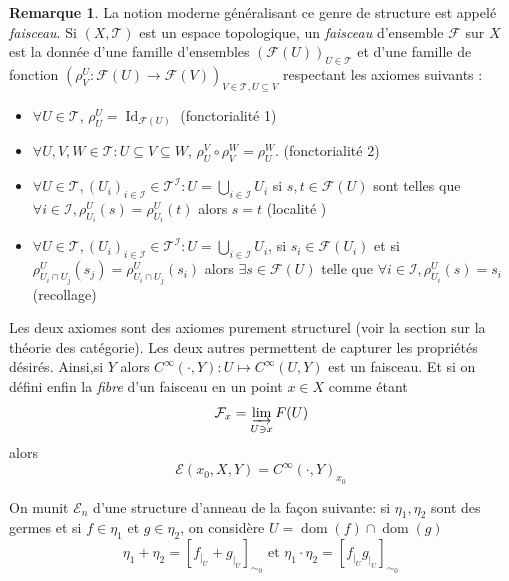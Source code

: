 \documentclass[a4paper,12pt,oneside,titlepage]{article}
\theoremstyle{definition}
\newtheorem{remarque}[definition]{Remarque}
\theoremstyle{plain}
\begin{document}
\begin{remarque}
    La notion moderne généralisant ce genre de structure est appelé \textit{faisceau}.
    Si $(X,\mathcal{T})$ est un espace topologique, un \textit{faisceau} d'ensemble $\mathcal{F}$ sur $X$ est la donnée d'une famille d'ensembles $(\mathcal{F}(U))_{U\in \mathcal{T} }$ et d'une famille de fonction $(\rho^U_V: \mathcal{F}(U)\rightarrow\mathcal{F}(V))_{V\in \mathcal{T}, U\subseteq V}$ respectant les axiomes suivants :
    \begin{itemize}
        \item $\forall U\in\mathcal{T}$, $\rho^U_U = \operatorname{Id}_{\mathcal{F}(U)}$ (fonctorialité 1)
        \item $\forall U,V,W\in\mathcal{T}: U\subseteq V\subseteq W$, $\rho^V_U\circ \rho^W_V=\rho^W_U$. (fonctorialité 2)
        \item $\forall U\in\mathcal{T}, (U_i)_{i\in\mathcal{I}}\in\mathcal{T}^{\mathcal{I}}: U=\bigcup_{i\in\mathcal{I}}U_i$ si $s,t\in\mathcal{F}(U)$ sont telles que \\$ \forall i\in\mathcal{I} ,\rho^U_{U_i}(s)=\rho^U_{U_i}(t)$ alors $s=t$ (localité )
        \item $\forall U\in\mathcal{T}, (U_i)_{i\in\mathcal{I}}\in\mathcal{T}^{\mathcal{I}}: U=\bigcup_{i\in\mathcal{I}}U_i$, si $s_i\in\mathcal{F}(U_i)$ et si $\rho^U_{U_i\cap U_j}(s_j)=\rho^U_{U_i\cap U_j}(s_i)$ alors $\exists s\in\mathcal{F}(U)$ telle que $\forall i\in\mathcal{I},\rho^U_{U_i}(s)=s_i$ (recollage)
    \end{itemize}
    Les deux axiomes sont des axiomes purement structurel (voir la section sur la théorie des catégorie). Les deux autres permettent de capturer les propriétés désirés. Ainsi,si $Y$ alors $C^{\infty}(\cdot,Y): U\mapsto C^{\infty}(U,Y)$ est un faisceau. Et si on défini enfin la \textit{fibre} d'un faisceau en un point $x\in X$ comme étant
    \begin{equation*}
        \mathcal{F}_x=\varinjlim_{U \ni x} F(U)
    \end{equation*}
    alors
    \begin{equation*}
        \mathcal{E}(x_0,X,Y)=C^{\infty}(\cdot,Y)_{x_0}
    \end{equation*} 
\end{remarque}

On munit $\mathcal{E}_n$ d'une structure d'anneau de la façon suivante: si $\eta_1,\eta_2$ sont des germes et si $f\in\eta_1$ et $g\in\eta_2$, on considère $U=\operatorname{dom}(f)\cap \operatorname{dom}(g)$ 
\begin{equation*}
    \eta_1+\eta_2= [f_{|_U}+g_{|_U}]_{\sim_{0}} \text{ et } \eta_1\cdot\eta_2= [f_{|_U}g_{|_U}]_{\sim_{0}}
\end{equation*}
\end{document}
